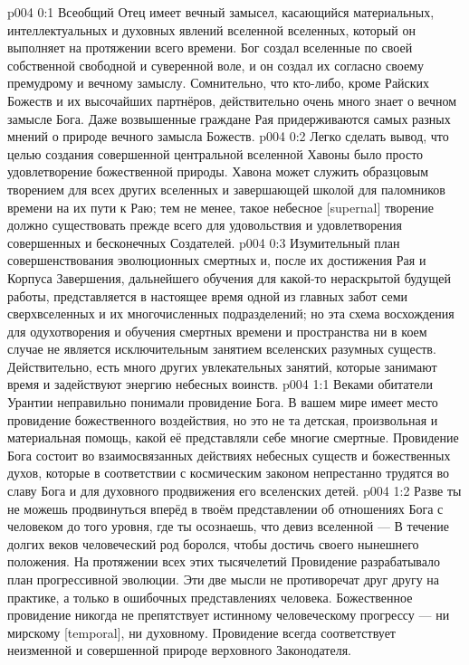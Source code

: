 \author{Божественный Советник}
\vs p004 0:1 Всеобщий Отец имеет вечный замысел, касающийся материальных, интеллектуальных и духовных явлений вселенной вселенных, который он выполняет на протяжении всего времени. Бог создал вселенные по своей собственной свободной и суверенной воле, и он создал их согласно своему премудрому и вечному замыслу. Сомнительно, что кто\hyp{}либо, кроме Райских Божеств и их высочайших партнёров, действительно очень много знает о вечном замысле Бога. Даже возвышенные граждане Рая придерживаются самых разных мнений о природе вечного замысла Божеств.
\vs p004 0:2 Легко сделать вывод, что целью создания совершенной центральной вселенной Хавоны было просто удовлетворение божественной природы. Хавона может служить образцовым творением для всех других вселенных и завершающей школой для паломников времени на их пути к Раю; тем не менее, такое небесное [supernal] творение должно существовать прежде всего для удовольствия и удовлетворения совершенных и бесконечных Создателей.
\vs p004 0:3 Изумительный план совершенствования эволюционных смертных и, после их достижения Рая и Корпуса Завершения, дальнейшего обучения для какой\hyp{}то нераскрытой будущей работы, представляется в настоящее время одной из главных забот семи сверхвселенных и их многочисленных подразделений; но эта схема восхождения для одухотворения и обучения смертных времени и пространства ни в коем случае не является исключительным занятием вселенских разумных существ. Действительно, есть много других увлекательных занятий, которые занимают время и задействуют энергию небесных воинств.
\vs p004 1:1 Веками обитатели Урантии неправильно понимали провидение Бога. В вашем мире имеет место провидение божественного воздействия, но это не та детская, произвольная и материальная помощь, какой её представляли себе многие смертные. Провидение Бога состоит во взаимосвязанных действиях небесных существ и божественных духов, которые в соответствии с космическим законом непрестанно трудятся во славу Бога и для духовного продвижения его вселенских детей.
\vs p004 1:2 Разве ты не можешь продвинуться вперёд в твоём представлении об отношениях Бога с человеком до того уровня, где ты осознаешь, что девиз вселенной ---  В течение долгих веков человеческий род боролся, чтобы достичь своего нынешнего положения. На протяжении всех этих тысячелетий Провидение разрабатывало план прогрессивной эволюции. Эти две мысли не противоречат друг другу на практике, а только в ошибочных представлениях человека. Божественное провидение никогда не препятствует истинному человеческому прогрессу --- ни мирскому [temporal], ни духовному. Провидение всегда соответствует неизменной и совершенной природе верховного Законодателя.
